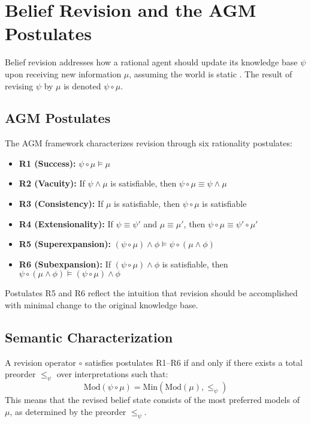 \documentclass[runningheads]{llncs}
\begin{document}
\section{Belief Revision and the AGM Postulates}

Belief revision addresses how a rational agent should update its knowledge base \( \psi \) upon receiving new information \( \mu \), assuming the world is static \cite{katsuno}. The result of revising \( \psi \) by \( \mu \) is denoted \( \psi \circ \mu \).

\subsection{AGM Postulates}

The AGM framework characterizes revision through six rationality postulates:

\begin{itemize}
    \item \textbf{R1 (Success):} \( \psi \circ \mu \models \mu \)
    \item \textbf{R2 (Vacuity):} If \( \psi \land \mu \) is satisfiable, then \( \psi \circ \mu \equiv \psi \land \mu \)
    \item \textbf{R3 (Consistency):} If \( \mu \) is satisfiable, then \( \psi \circ \mu \) is satisfiable
    \item \textbf{R4 (Extensionality):} If \( \psi \equiv \psi' \) and \( \mu \equiv \mu' \), then \( \psi \circ \mu \equiv \psi' \circ \mu' \)
    \item \textbf{R5 (Superexpansion):} \( (\psi \circ \mu) \land \phi \models \psi \circ (\mu \land \phi) \)
    \item \textbf{R6 (Subexpansion):} If \( (\psi \circ \mu) \land \phi \) is satisfiable, then \( \psi \circ (\mu \land \phi) \models (\psi \circ \mu) \land \phi \)
\end{itemize}

Postulates R5 and R6 reflect the intuition that revision should be accomplished with minimal change to the original knowledge base.

\subsection{Semantic Characterization}

A revision operator \( \circ \) satisfies postulates R1–R6 if and only if there exists a total preorder \( \leq_\psi \) over interpretations such that:
\[
\text{Mod}(\psi \circ \mu) = \text{Min}(\text{Mod}(\mu), \leq_\psi)
\]
This means that the revised belief state consists of the most preferred models of \( \mu \), as determined by the preorder \( \leq_\psi \).
\end{document}
